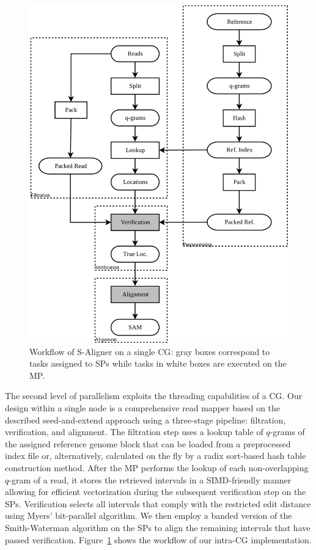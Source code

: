 \begin{figure}[!htb]
  \includegraphics[width=1\linewidth]{figures/FrmWk}
  \caption{Workflow of S-Aligner on a single CG: gray boxes correspond
    to tasks assigned to SPs while tasks in white boxes are executed
    on the MP.}
  \label{FrmWk}
\end{figure}

The second level of parallelism exploits the threading capabilities of
a CG. Our design within a single node is a comprehensive read mapper
based on the described seed-and-extend approach using a three-stage
pipeline: filtration, verification, and alignment. The filtration step
uses a lookup table of $q$-grams of the assigned reference genome
block that can be loaded from a preprocessed index file or,
alternatively, calculated on the fly by a radix sort-based hash table
construction method. After the MP performs the lookup of each
non-overlapping $q$-gram of a read, it stores the retrieved intervals
in a SIMD-friendly manner allowing for efficient vectorization during
the subsequent verification step on the SPs. Verification selects all
intervals that comply with the restricted edit distance using Myers'
bit-parallel algorithm. We then employ a banded version of the
Smith-Waterman algorithm on the SPs to align the remaining intervals
that have passed verification. Figure~\ref{FrmWk} shows the workflow
of our intra-CG implementation.

